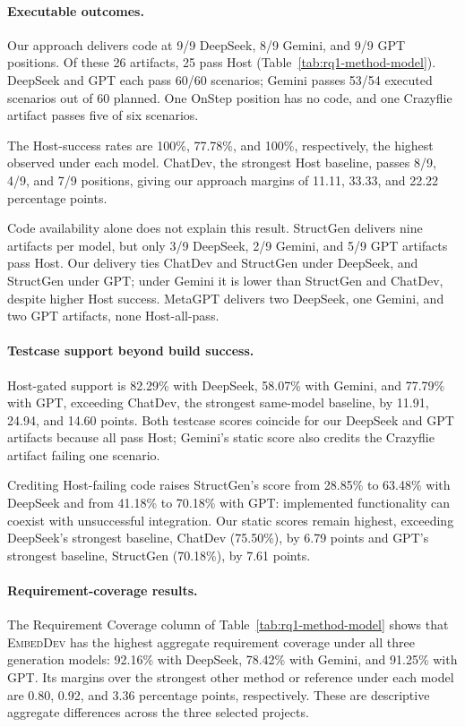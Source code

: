 \paragraph{Executable outcomes.}
Our approach delivers code at 9/9 DeepSeek, 8/9 Gemini, and 9/9 GPT positions. Of these 26 artifacts, 25 pass Host (Table~\ref{tab:rq1-method-model}). DeepSeek and GPT each pass 60/60 scenarios; Gemini passes 53/54 executed scenarios out of 60 planned. One OnStep position has no code, and one Crazyflie artifact passes five of six scenarios.

The Host-success rates are 100\%, 77.78\%, and 100\%, respectively, the highest observed under each model. ChatDev, the strongest Host baseline, passes 8/9, 4/9, and 7/9 positions, giving our approach margins of 11.11, 33.33, and 22.22 percentage points.

Code availability alone does not explain this result. StructGen delivers nine artifacts per model, but only 3/9 DeepSeek, 2/9 Gemini, and 5/9 GPT artifacts pass Host. Our delivery ties ChatDev and StructGen under DeepSeek, and StructGen under GPT; under Gemini it is lower than StructGen and ChatDev, despite higher Host success. MetaGPT delivers two DeepSeek, one Gemini, and two GPT artifacts, none Host-all-pass.

\paragraph{Testcase support beyond build success.}
Host-gated support is 82.29\% with DeepSeek, 58.07\% with Gemini, and 77.79\% with GPT, exceeding ChatDev, the strongest same-model baseline, by 11.91, 24.94, and 14.60 points. Both testcase scores coincide for our DeepSeek and GPT artifacts because all pass Host; Gemini's static score also credits the Crazyflie artifact failing one scenario.

Crediting Host-failing code raises StructGen's score from 28.85\% to 63.48\% with DeepSeek and from 41.18\% to 70.18\% with GPT: implemented functionality can coexist with unsuccessful integration. Our static scores remain highest, exceeding DeepSeek's strongest baseline, ChatDev (75.50\%), by 6.79 points and GPT's strongest baseline, StructGen (70.18\%), by 7.61 points.

\paragraph{Requirement-coverage results.}
The Requirement Coverage column of Table~\ref{tab:rq1-method-model} shows that \textsc{EmbedDev} has the highest aggregate requirement coverage under all three generation models: 92.16\% with DeepSeek, 78.42\% with Gemini, and 91.25\% with GPT. Its margins over the strongest other method or reference under each model are 0.80, 0.92, and 3.36 percentage points, respectively. These are descriptive aggregate differences across the three selected projects.

